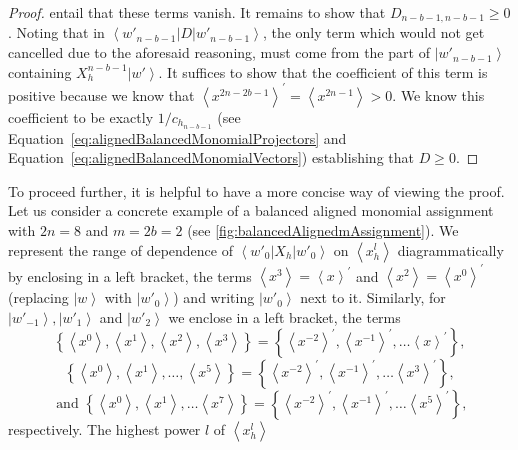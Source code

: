\documentclass{theoretics}
\begin{document}
\begin{proof}
  entail that these terms vanish. It remains to show that $D_{n-b-1,n-b-1}\ge0$.
  Noting that in $\left\langle w'_{n-b-1}\right|D\left|w'_{n-b-1}\right\rangle $,
  the only term which would not get cancelled due to the aforesaid reasoning,
  must come from the part of $\left|w'_{n-b-1}\right\rangle $ containing
  $X_{h}^{n-b-1}\left|w'\right\rangle $. It suffices to show that the
  coefficient of this term is positive because we know that $\left\langle x^{2n-2b-1}\right\rangle ^{\prime}=\left\langle x^{2n-1}\right\rangle >0$.
  We know this coefficient to be exactly $1/c_{h_{n-b-1}}$
  (see Equation~\eqref{eq:alignedBalancedMonomialProjectors} and Equation~\eqref{eq:alignedBalancedMonomialVectors})
  establishing that $D\ge0$.
\end{proof}


To proceed further, it is helpful to have a more concise way of viewing
the proof. Let us consider a concrete example of a balanced
aligned monomial assignment with $2n=8$ and $m=2b=2$ (see  \cref{fig:balancedAlignedmAssignment}).
We represent the range of dependence of $\left\langle w'_{0}\right|X_{h}\left|w'_{0}\right\rangle $
on $\left\langle x_{h}^{l}\right\rangle $ diagrammatically by enclosing
in a left bracket, the terms $\left\langle x^{3}\right\rangle =\left\langle x\right\rangle ^{\prime}$
and $\left\langle x^{2}\right\rangle =\left\langle x^{0}\right\rangle ^{\prime}$
(replacing $\left|w\right\rangle $ with $\left|w'_{0}\right\rangle $)
and writing $\left|w'_{0}\right\rangle $ next to it. Similarly, for
$\left|w'_{-1}\right\rangle ,\left|w'_{1}\right\rangle $ and $\left|w'_{2}\right\rangle $
we enclose in a left bracket, the terms
\begin{displaymath}
  \left\{ \left\langle x^{0}\right\rangle ,\left\langle x^{1}\right\rangle ,\left\langle x^{2}\right\rangle ,\left\langle x^{3}\right\rangle \right\} =\left\{ \left\langle x^{-2}\right\rangle ^{\prime},\left\langle x^{-1}\right\rangle ^{\prime},\dots\left\langle x\right\rangle ^{\prime}\right\} ,\end{displaymath}
\begin{displaymath}\left\{ \left\langle x^{0}\right\rangle ,\left\langle x^{1}\right\rangle ,\dots,\left\langle x^{5}\right\rangle \right\} =\left\{ \left\langle x^{-2}\right\rangle ^{\prime},\left\langle x^{-1}\right\rangle ^{\prime},\dots\left\langle x^{3}\right\rangle ^{\prime}\right\},
\end{displaymath}
\begin{displaymath}\text{ and }
  \left\{ \left\langle x^{0}\right\rangle ,\left\langle x^{1}\right\rangle ,\dots\left\langle x^{7}\right\rangle \right\} =\left\{ \left\langle x^{-2}\right\rangle ^{\prime},\left\langle x^{-1}\right\rangle ^{\prime},\dots\left\langle x^{5}\right\rangle ^{\prime}\right\},
\end{displaymath}respectively. The highest power $l$ of $\left\langle x_{h}^{l}\right\rangle $
\end{document}

